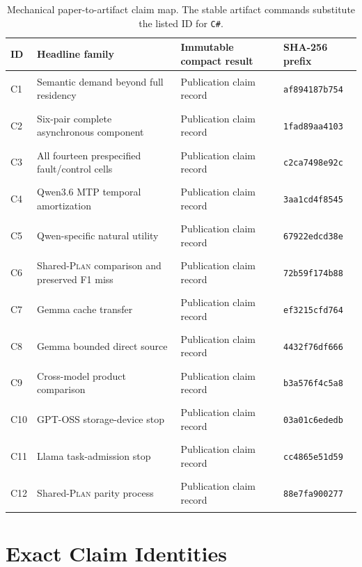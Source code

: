 \documentclass[letterpaper,twocolumn,10pt]{article}
\newcommand{\Plan}{\textsc{Plan}\xspace}
\begin{document}
\begin{table}[t]
  \centering
  \scriptsize
  \caption{Mechanical paper-to-artifact claim map.  The stable artifact commands
  substitute the listed ID for \texttt{C\#}.}
  \label{tab:claimledger}
  \begin{tabularx}{\textwidth}{@{}p{0.75cm}p{5.2cm}p{5.4cm}X@{}}
    \toprule
    ID & Headline family & Immutable compact result & SHA-256 prefix \\
    \midrule
    \hypertarget{claim:C1}{C1} & Semantic demand beyond full residency & Publication claim record & \texttt{af894187b754} \\
    \hypertarget{claim:C2}{C2} & Six-pair complete asynchronous component & Publication claim record & \texttt{1fad89aa4103} \\
    \hypertarget{claim:C3}{C3} & All fourteen prespecified fault/control cells & Publication claim record & \texttt{c2ca7498e92c} \\
    \hypertarget{claim:C4}{C4} & Qwen3.6 MTP temporal amortization & Publication claim record & \texttt{3aa1cd4f8545} \\
    \hypertarget{claim:C5}{C5} & Qwen-specific natural utility & Publication claim record & \texttt{67922edcd38e} \\
    \hypertarget{claim:C6}{C6} & Shared-\Plan comparison and preserved F1 miss & Publication claim record & \texttt{72b59f174b88} \\
    \hypertarget{claim:C7}{C7} & Gemma cache transfer & Publication claim record & \texttt{ef3215cfd764} \\
    \hypertarget{claim:C8}{C8} & Gemma bounded direct source & Publication claim record & \texttt{4432f76df666} \\
    \hypertarget{claim:C9}{C9} & Cross-model product comparison & Publication claim record & \texttt{b3a576f4c5a8} \\
    \hypertarget{claim:C10}{C10} & GPT-OSS storage-device stop & Publication claim record & \texttt{03a01c6ededb} \\
    \hypertarget{claim:C11}{C11} & Llama task-admission stop & Publication claim record & \texttt{cc4865e51d59} \\
    \hypertarget{claim:C12}{C12} & Shared-\Plan parity process & Publication claim record & \texttt{88e7fa900277} \\
    \bottomrule
  \end{tabularx}
\end{table}

\section{Exact Claim Identities}
\label{sec:identities}
\end{document}
